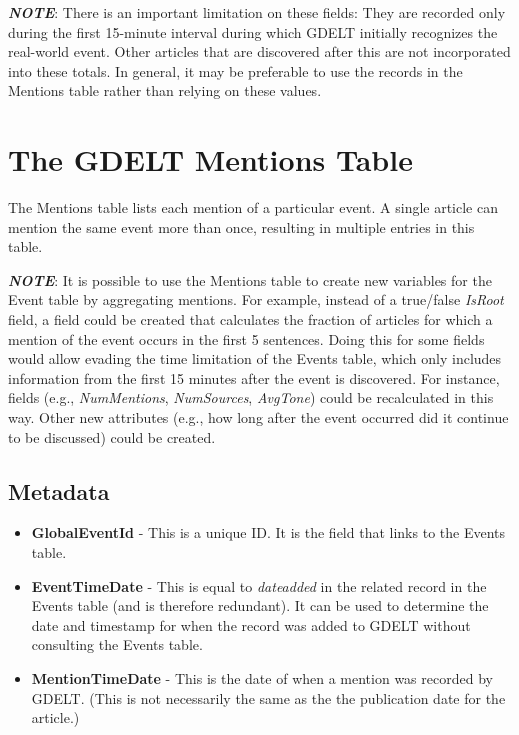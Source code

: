 \par \textbf{\textit{NOTE}}: There is an important limitation on these fields: They are recorded only during the first 15-minute interval during which GDELT initially recognizes the real-world event. Other articles that are discovered after this are not incorporated into these totals. In general, it may be preferable to use the records in the Mentions table rather than relying on these values.

\section{The GDELT Mentions Table}

\par The Mentions table lists each mention of a particular event. A single article can mention the same event more than once, resulting in multiple entries in this table.

\par \textbf{\textit{NOTE}}: It is possible to use the Mentions table to create new variables for the Event table by aggregating mentions. For example, instead of a true/false \textit{IsRoot} field, a field could be created that calculates the fraction of articles for which a mention of the event occurs in the first 5 sentences. Doing this for some fields would allow evading the time limitation of the Events table, which only includes information from the first 15 minutes after the event is discovered. For instance, fields (e.g., \textit{NumMentions}, \textit{NumSources}, \textit{AvgTone}) could be recalculated in this way. Other new attributes (e.g., how long after the event occurred did it continue to be discussed) could be created.



\subsection{Metadata}
   \begin{itemize} 
   	\item \textbf{GlobalEventId} - This is a unique ID. It is the field that links to the Events table.
	\item \textbf{EventTimeDate} - This is equal to \emph{dateadded} in the related record in the Events table (and is therefore redundant). It can be used to determine the date and timestamp for when the record was added to GDELT without consulting the Events table.
	\item \textbf{MentionTimeDate} - This is the date of when a mention was recorded by GDELT. (This is not necessarily the same as the the publication date for the article.)
   \end{itemize}
  
